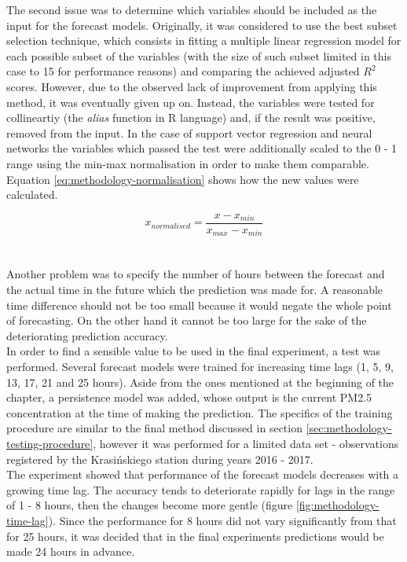 The second issue was to determine which variables should be included as the input for the forecast models. Originally, it was considered to use the best subset selection technique, which consists in fitting a multiple linear regression model for each possible subset of the variables (with the size of such subset limited in this case to 15 for performance reasons) and comparing the achieved adjusted $R^2$ scores. However, due to the observed lack of improvement from applying this method, it was eventually given up on. Instead, the variables were tested for collineartiy (the \textit{alias} function in R language) and, if the result was positive, removed from the input. In the case of support vector regression and neural networks the variables which passed the test were additionally scaled to the 0 - 1 range using the min-max normalisation in order to make them comparable. Equation \ref{eq:methodology-normalisation} shows how the new values were calculated.

\begin{equation}\label{eq:methodology-normalisation}
x_{normalised} = \frac{x - x_{min}}{x_{max} - x_{min}}
\end{equation}
\\\\
Another problem was to specify the number of hours between the forecast and the actual time in the future which the prediction was made for. A reasonable time difference should not be too small because it would negate the whole point of forecasting. On the other hand it cannot be too large for the sake of the deteriorating prediction accuracy.
\\
In order to find a sensible value to be used in the final experiment, a test was performed. Several forecast models were trained for increasing time lags (1, 5, 9, 13, 17, 21 and 25 hours). Aside from the ones mentioned at the beginning of the chapter, a persistence model was added, whose output is the current PM2.5 concentration at the time of making the prediction. The specifics of the training procedure are similar to the final method discussed in section \ref{sec:methodology-testing-procedure}, however it was performed for a limited data set - observations registered by the Krasińskiego station during years 2016 - 2017.
\\
The experiment showed that performance of the forecast models decreases with a growing time lag. The accuracy tends to deteriorate rapidly for lags in the range of 1 - 8 hours, then the changes become more gentle (figure \ref{fig:methodology-time-lag}). Since the performance for 8 hours did not vary significantly from that for 25 hours, it was decided that in the final experiments predictions would be made 24 hours in advance.

